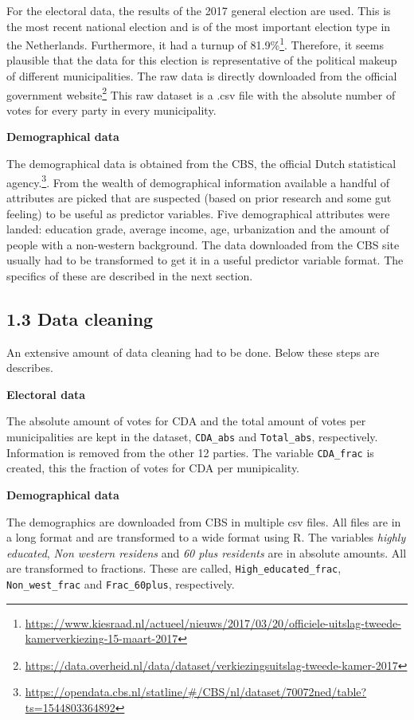 \documentclass[11pt,]{article}
\let\rmarkdownfootnote\footnote%
\def\footnote{\protect\rmarkdownfootnote}
\begin{document}
For the electoral data, the results of the 2017 general election are
used. This is the most recent national election and is of the most
important election type in the Netherlands. Furthermore, it had a turnup
of 81.9\%\footnote{\url{https://www.kiesraad.nl/actueel/nieuws/2017/03/20/officiele-uitslag-tweede-kamerverkiezing-15-maart-2017}}.
Therefore, it seems plausible that the data for this election is
representative of the political makeup of different municipalities. The
raw data is directly downloaded from the official government
website\footnote{\url{https://data.overheid.nl/data/dataset/verkiezingsuitslag-tweede-kamer-2017}}
This raw dataset is a .csv file with the absolute number of votes for
every party in every municipality.

\textbf{Demographical data}

The demographical data is obtained from the CBS, the official Dutch
statistical agency.\footnote{\url{https://opendata.cbs.nl/statline/\#/CBS/nl/dataset/70072ned/table?ts=1544803364892}}.
From the wealth of demographical information available a handful of
attributes are picked that are suspected (based on prior research and
some gut feeling) to be useful as predictor variables. Five
demographical attributes were landed: education grade, average income,
age, urbanization and the amount of people with a non-western
background. The data downloaded from the CBS site usually had to be
transformed to get it in a useful predictor variable format. The
specifics of these are described in the next section.

\subsection{1.3 Data cleaning}\label{data-cleaning}

An extensive amount of data cleaning had to be done. Below these steps
are describes.

\textbf{Electoral data}

The absolute amount of votes for CDA and the total amount of votes per
municipalities are kept in the dataset, \texttt{CDA\_abs} and
\texttt{Total\_abs}, respectively. Information is removed from the other
12 parties. The variable \texttt{CDA\_frac} is created, this the
fraction of votes for CDA per munipicality.

\textbf{Demographical data}

The demographics are downloaded from CBS in multiple csv files. All
files are in a long format and are transformed to a wide format using R.
The variables \emph{highly educated}, \emph{Non western residens} and
\emph{60 plus residents} are in absolute amounts. All are transformed to
fractions. These are called, \texttt{High\_educated\_frac},
\texttt{Non\_west\_frac} and \texttt{Frac\_60plus}, respectively.
\end{document}
